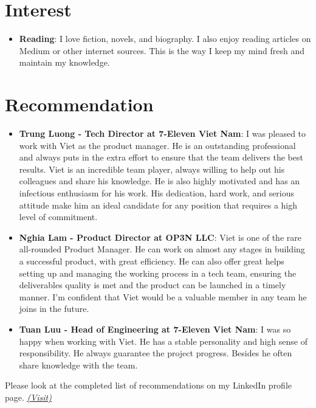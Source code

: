 \documentclass[letterpaper,11pt]{article}
\newcommand{\resumeItem}[2]{
  \item\small{
    \textbf{#1}{: #2 \vspace{-2pt}}
  }
}
\newcommand{\resumeSubItem}[2]{\resumeItem{#1}{#2}\vspace{-4pt}}
\newcommand{\resumeSubHeadingListStart}{\begin{itemize}[leftmargin=*]}
\newcommand{\resumeSubHeadingListEnd}{\end{itemize}}
\begin{document}
\section{Interest}
\resumeSubHeadingListStart
  \resumeSubItem{Reading}
    {I love fiction, novels, and biography. I also enjoy reading articles on Medium or other internet sources. This is the way I keep my mind fresh and maintain my knowledge.}
\resumeSubHeadingListEnd

\section{Recommendation}
    \resumeSubHeadingListStart
        \resumeSubItem{Trung Luong - Tech Director at 7-Eleven Viet Nam}
            {I was pleased to work with Viet as the product manager. He is an outstanding professional and always puts in the extra effort to ensure that the team delivers the best results. Viet is an incredible team player, always willing to help out his colleagues and share his knowledge. He is also highly motivated and has an infectious enthusiasm for his work. His dedication, hard work, and serious attitude make him an ideal candidate for any position that requires a high level of commitment.}
         \resumeSubItem{Nghia Lam - Product Director at OP3N LLC}
            {Viet is one of the rare all-rounded Product Manager. He can work on almost any stages in building a successful product, with great efficiency. He can also offer great helps setting up and managing the working process in a tech team, ensuring the deliverables quality is met and the product can be launched in a timely manner. I’m confident that Viet would be a valuable member in any team he joins in the future.}
        \resumeSubItem{Tuan Luu - Head of Engineering at 7-Eleven Viet Nam}
            {I was so happy when working with Viet. He has a stable personality and high sense of responsibility. He always guarantee the project progress. Besides he often share knowledge with the team.}
    \resumeSubHeadingListEnd
    {Please look at the completed list of recommendations on my LinkedIn profile page.} \href{https://www.linkedin.com/in/vietch2612/details/recommendations/?detailScreenTabIndex=0}{\underline{\textit{(Visit)}}}


\end{document}
